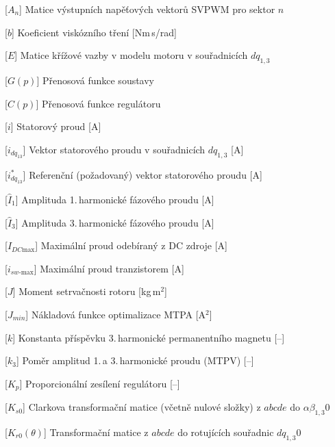 \begin{acronym}[DSP48E1]

    [\ensuremath{A_n}]
    {Matice výstupních napěťových vektorů SVPWM pro sektor $n$}

    [\ensuremath{b}]
    {Koeficient viskózního tření \hfill [Nm\,s/rad]}

    [\ensuremath{E}]
    {Matice křížové vazby v modelu motoru v souřadnicích $dq_{1,3}$}

    [\ensuremath{G(p)}]
    {Přenosová funkce soustavy}

    [\ensuremath{C(p)}]
    {Přenosová funkce regulátoru}

    [\ensuremath{i}]
    {Statorový proud \hfill [A]}

    [\ensuremath{i_{dq_{13}}}]
    {Vektor statorového proudu v souřadnicích $dq_{1,3}$ \hfill [A]}

    [\ensuremath{i_{dq_{13}}^*}]
    {Referenční (požadovaný) vektor statorového proudu \hfill [A]}

    [\ensuremath{\hat{I}_1}]
    {Amplituda 1.\,harmonické fázového proudu \hfill [A]}

    [\ensuremath{\hat{I}_3}]
    {Amplituda 3.\,harmonické fázového proudu \hfill [A]}

    [\ensuremath{I_{DC\text{max}}}]
    {Maximální proud odebíraný z DC zdroje \hfill [A]}

    [\ensuremath{i_{sw\text{-max}}}]
    {Maximální proud tranzistorem \hfill [A]}

    [\ensuremath{J}]
    {Moment setrvačnosti rotoru \hfill [kg\,m$^2$]}

    [\ensuremath{J_{min}}]
    {Nákladová funkce optimalizace MTPA \hfill [A$^2$]}

    [\ensuremath{k}]
    {Konstanta příspěvku 3.\,harmonické permanentního magnetu \hfill [--]}

    [\ensuremath{k_3}]
    {Poměr amplitud 1.\,a 3.\,harmonické proudu (MTPV) \hfill [--]}

    [\ensuremath{K_p}]
    {Proporcionální zesílení regulátoru \hfill [--]}

    [\ensuremath{K_{s0}}]
    {Clarkova transformační matice (včetně nulové složky) z $abcde$ do $\alpha\beta_{1,3}0$}

    [\ensuremath{K_{r0}(\theta)}]
    {Transformační matice z $abcde$ do rotujících souřadnic $dq_{1,3}0$}


\end{acronym}
